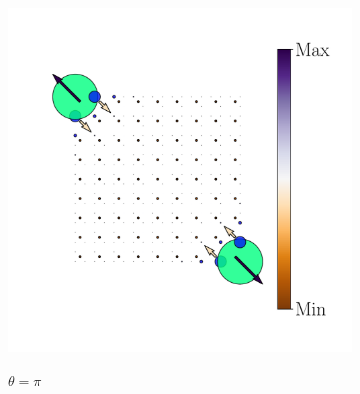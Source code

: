 \begin{figure}[h!]
\begin{minipage}[h!]{1.1\textwidth}
\begin{subfigure}[b!]{0.2 \textwidth}
             \label{}
         \end{subfigure}\hspace*{-0.5em}
          \begin{subfigure}[b!]{0.2 \textwidth}
             \caption*{$\theta = \pi$}
             \includegraphics[width=\textwidth]{Imagenes/Resultados_pump_Cuadrado/xy/hoti_pomp_xy_neg5.pdf}
             \label{}
         \end{subfigure}\hspace*{-0.5em}
     \end{minipage}\vspace*{-1em}
     
    
     
     
    \caption{}
    \label{fig:Proy_pump_xy}
\end{figure}